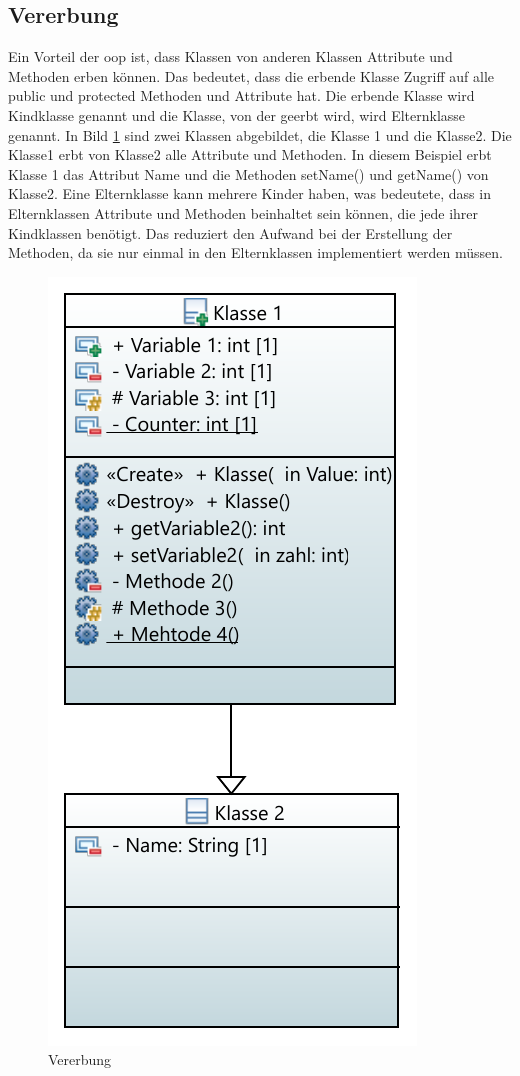 \subsection{Vererbung}
Ein Vorteil der \ac{oop} ist, dass Klassen von anderen Klassen Attribute und Methoden erben können. Das bedeutet, dass die erbende Klasse Zugriff auf alle \glqq public\grqq{} und  \glqq protected\grqq{} Methoden und Attribute hat. Die erbende Klasse wird Kindklasse genannt und die Klasse, von der geerbt wird, wird Elternklasse genannt. In Bild \ref{fig:vererbung} sind zwei Klassen abgebildet, die Klasse 1 und die Klasse2. Die Klasse1 erbt von Klasse2 alle Attribute und Methoden. In diesem Beispiel erbt Klasse 1 das Attribut   \glqq Name\grqq{} und die Methoden  \glqq setName()\grqq{} und  \glqq getName()\grqq{} von Klasse2. Eine Elternklasse kann mehrere Kinder haben, was bedeutete, dass in Elternklassen Attribute und Methoden beinhaltet sein können, die jede ihrer Kindklassen benötigt. Das reduziert den Aufwand bei der Erstellung der Methoden, da sie nur einmal in den Elternklassen implementiert werden müssen.   
 \begin{figure}[H]
	\centering
		\includegraphics[scale=0.9]{bilder/pdfvorlagen/tes.pdf}
	\caption[Vererbung]{Vererbung}
	\label{fig:vererbung}
\end{figure}
